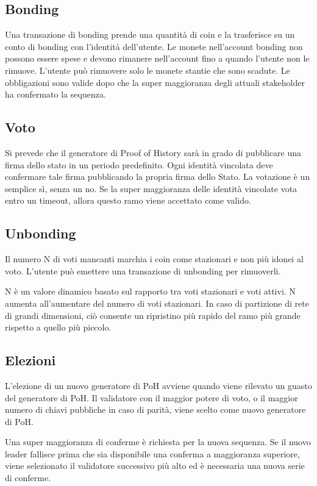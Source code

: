 \documentclass[12pt]{article}
\begin{document}
\subsection{Bonding}
Una transazione di bonding prende una quantità di coin  e la trasferisce su un conto di bonding con l'identità dell'utente. Le monete nell'account bonding non possono essere spese e devono rimanere nell'account fino a quando l'utente non le rimuove. L'utente può rimuovere solo le monete stantie che sono scadute. Le obbligazioni sono valide dopo che la super maggioranza degli attuali stakeholder ha confermato la sequenza.


\subsection{Voto}
Si prevede che il generatore di Proof of History sarà in grado di pubblicare una firma dello stato in un periodo predefinito. Ogni identità vincolata deve confermare tale firma pubblicando la propria firma dello Stato. La votazione è un semplice sì, senza un no. Se la super maggioranza delle identità vincolate vota entro un timeout, allora questo ramo viene accettato come valido.

\subsection{Unbonding}

Il numero N di voti mancanti marchia i coin come stazionari e non più idonei al voto. L'utente può emettere una transazione di unbonding per rimuoverli.

N è un valore dinamico basato sul rapporto tra voti stazionari e voti attivi. N aumenta all'aumentare del numero di voti stazionari. In caso di partizione di rete di grandi dimensioni, ciò consente un ripristino più rapido del ramo più grande rispetto a quello più piccolo.


\subsection{Elezioni}\label{subsec:elections}
L'elezione di un nuovo generatore di PoH avviene quando viene rilevato un guasto del generatore di PoH. Il validatore con il maggior potere di voto, o il maggior numero di chiavi pubbliche in caso di parità, viene scelto come nuovo generatore di PoH.

Una super maggioranza di conferme è richiesta per la nuova sequenza. Se il nuovo leader fallisce prima che sia disponibile una conferma a maggioranza superiore, viene selezionato il validatore successivo più alto ed è necessaria una nuova serie di conferme.
\end{document}
